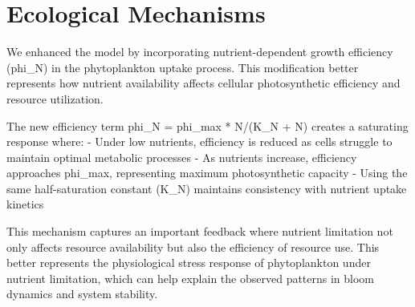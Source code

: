 \section{Ecological Mechanisms}

We enhanced the model by incorporating nutrient-dependent growth efficiency (phi_N) in the phytoplankton uptake process. This modification better represents how nutrient availability affects cellular photosynthetic efficiency and resource utilization.

The new efficiency term phi_N = phi_max * N/(K_N + N) creates a saturating response where:
- Under low nutrients, efficiency is reduced as cells struggle to maintain optimal metabolic processes
- As nutrients increase, efficiency approaches phi_max, representing maximum photosynthetic capacity
- Using the same half-saturation constant (K_N) maintains consistency with nutrient uptake kinetics

This mechanism captures an important feedback where nutrient limitation not only affects resource availability but also the efficiency of resource use. This better represents the physiological stress response of phytoplankton under nutrient limitation, which can help explain the observed patterns in bloom dynamics and system stability.
